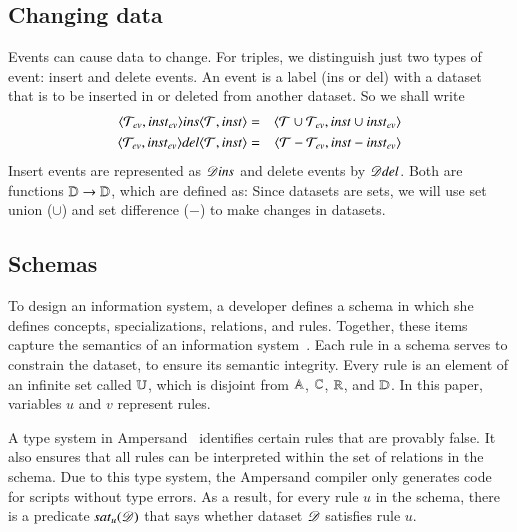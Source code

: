 \documentclass{elsarticle}
\begin{document}
\subsection{Changing data}
\label{sct:Changing data}
   Events can cause data to change.
   For triples, we distinguish just two types of event: insert and delete events.
   An event is a label (ins or del) with a dataset that is to be inserted in or deleted from another dataset.
   So we shall write
\begin{eqnarray}
   \langle{\mathcal{T}_{\text{\it ev\/}}},{\mathbin{\text{\it inst\/}}_{\text{\it ev\/}}}\rangle\text{\it ins\/}\langle{\mathcal{T}},{\mathbin{\text{\it inst\/}}}\rangle&=&\langle{\mathcal{T}\cup\mathcal{T}_{\text{\it ev\/}}},{\mathbin{\text{\it inst\/}}\cup\mathbin{\text{\it inst\/}}_{\text{\it ev\/}}}\rangle\\
   \langle{\mathcal{T}_{\text{\it ev\/}}},{\mathbin{\text{\it inst\/}}_{\text{\it ev\/}}}\rangle\text{\it del\/}\langle{\mathcal{T}},{\mathbin{\text{\it inst\/}}}\rangle&=&\langle{\mathcal{T}-\mathcal{T}_{\text{\it ev\/}}},{\mathbin{\text{\it inst\/}}-\mathbin{\text{\it inst\/}}_{\text{\it ev\/}}}\rangle
\end{eqnarray}
   Insert events are represented as $\mathscr{D}\text{\it ins\/}$ and delete events by $\mathscr{D}\text{\it del\/}$.
   Both are functions $\mathbb{D}\rightarrow\mathbb{D}$, which are defined as:
   Since datasets are sets, we will use set union ($\cup$) and set difference ($-$) to make changes in datasets.


\subsection{Schemas}
\label{sct:Schemas}
   To design an information system, a developer defines a schema in which she defines concepts, specializations, relations, and rules.
   Together, these items capture the semantics of an information system~\cite{Spivak2012}.
   Each rule in a schema serves to constrain the dataset, to ensure its semantic integrity.
   Every rule is an element of an infinite set called $\mathbb{U}$,
   which is disjoint from $\mathbb{A}$, $\mathbb{C}$, $\mathbb{R}$, and $\mathbb{D}$.
   In this paper, variables $u$ and $v$ represent rules.

   A type system in Ampersand~\cite{vdWoude2011} identifies certain rules that are provably false.
   It also ensures that all rules can be interpreted within the set of relations in the schema.
   Due to this type system, the Ampersand compiler only generates code for scripts without type errors.
   As a result, for every rule $u$ in the schema, there is a predicate $\text{\it sat\/}_{u}(\mathscr{D})$ that says whether dataset $\mathscr{D}$ satisfies rule $u$.
\end{document}
